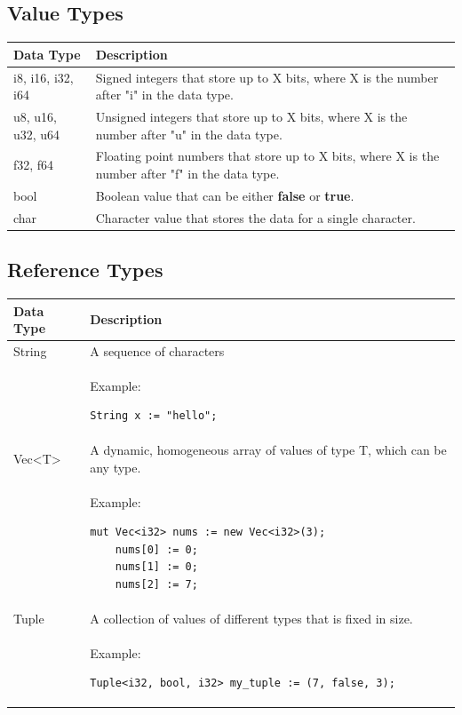 \documentclass[letterpaper, 10pt, DIV=13]{scrartcl}
\numberwithin{equation}{section}
\numberwithin{figure}{section}
\numberwithin{table}{section}
\begin{document}
\subsection{Value Types}
\begin{center}
\begin{longtable}{|p{3in}|p{3in}|}
    \hline
    \textbf{Data Type} & \textbf{Description} \\
    \hline
    i8, i16, i32, i64 & Signed integers that store up to X bits, where X is the
                        number after "i" in the data type. \\
    \hline
    u8, u16, u32, u64 & Unsigned integers that store up to X bits, where X is the
                        number after "u" in the data type. \\
    \hline
    f32, f64 & Floating point numbers that store up to X bits, where X is the
               number after "f" in the data type. \\
    \hline
    bool & Boolean value that can be either \textbf{false} or \textbf{true}. \\
    \hline
    char & Character value that stores the data for a single character. \\
    \hline
\end{longtable}
\end{center}

\subsection{Reference Types}
\begin{center}
\begin{longtable}{|p{3in}|p{3in}|}
    \hline
    \textbf{Data Type} & \textbf{Description} \\
    \hline
    String & A sequence of characters \\
    & Example: \begin{lstlisting}[nolol, numbers = none]
    String x := "hello";
    \end{lstlisting} \\
    \hline
    Vec<T> & A dynamic, homogeneous array of values of type T, which can be any type. \\
    & Example: \begin{lstlisting}[nolol, numbers = none]
    mut Vec<i32> nums := new Vec<i32>(3);
    nums[0] := 0;
    nums[1] := 0;
    nums[2] := 7;
    \end{lstlisting} \\
    \hline
    Tuple & A collection of values of different types that is fixed in size. \\
    & Example: \begin{lstlisting}[nolol, numbers = none]
    Tuple<i32, bool, i32> my_tuple := (7, false, 3);
    \end{lstlisting} \\
    \hline
\end{longtable}
\end{center}
\end{document}
